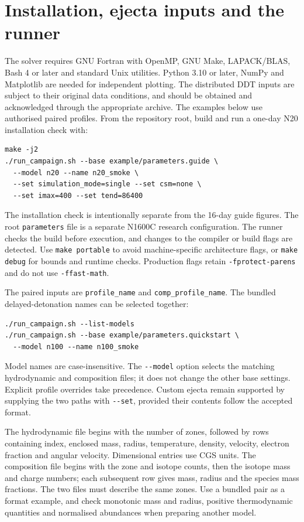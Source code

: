 \documentclass[11pt,a4paper]{article}
\newcommand{\code}[1]{\nolinkurl{#1}}
\begin{document}
\section{Installation, ejecta inputs and the runner}
The solver requires GNU Fortran with OpenMP, GNU Make, LAPACK/BLAS, Bash 4 or later and standard Unix utilities. Python 3.10 or later, NumPy and Matplotlib are needed for independent plotting. The distributed DDT inputs are subject to their original data conditions, and should be obtained and acknowledged through the appropriate archive. The examples below use authorised paired profiles. From the repository root, build and run a one-day N20 installation check with:
\begin{lstlisting}
make -j2
./run_campaign.sh --base example/parameters.guide \
  --model n20 --name n20_smoke \
  --set simulation_mode=single --set csm=none \
  --set imax=400 --set tend=86400
\end{lstlisting}
The installation check is intentionally separate from the 16-day guide figures. The root \code{parameters} file is a separate N1600C research configuration. The runner checks the build before execution, and changes to the compiler or build flags are detected. Use \code{make portable} to avoid machine-specific architecture flags, or \code{make debug} for bounds and runtime checks. Production flags retain \code{-fprotect-parens} and do not use \code{-ffast-math}.

The paired inputs are \code{profile_name} and \code{comp_profile_name}. The bundled delayed-detonation names can be selected together:
\begin{lstlisting}
./run_campaign.sh --list-models
./run_campaign.sh --base example/parameters.quickstart \
  --model n100 --name n100_smoke
\end{lstlisting}
Model names are case-insensitive. The \code{--model} option selects the matching hydrodynamic and composition files; it does not change the other base settings. Explicit profile overrides take precedence. Custom ejecta remain supported by supplying the two paths with \code{--set}, provided their contents follow the accepted format.

The hydrodynamic file begins with the number of zones, followed by rows containing index, enclosed mass, radius, temperature, density, velocity, electron fraction and angular velocity. Dimensional entries use CGS units. The composition file begins with the zone and isotope counts, then the isotope mass and charge numbers; each subsequent row gives mass, radius and the species mass fractions. The two files must describe the same zones. Use a bundled pair as a format example, and check monotonic mass and radius, positive thermodynamic quantities and normalised abundances when preparing another model.
\end{document}
